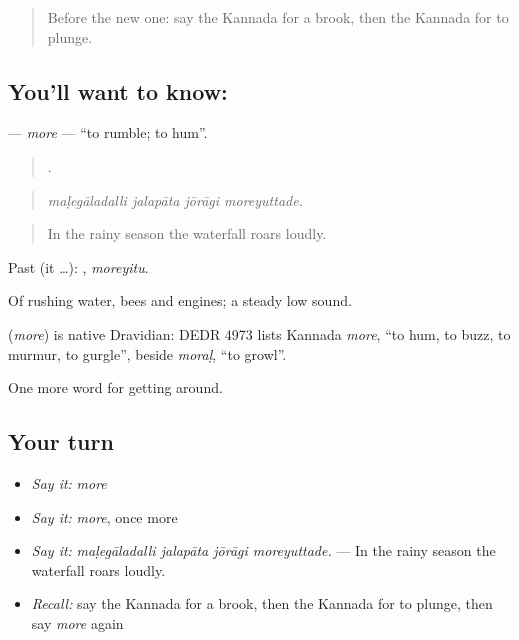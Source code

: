 \label{lesson:KA-C482-more}



\begin{quote}
Before the new one: say the Kannada for a brook, then the Kannada for to plunge.
\end{quote}

\subsection*{You'll want to know: }
\textbf{} — \emph{more} — \textquotedblleft{}to rumble; to hum\textquotedblright{}.

\begin{quote}
   .
\end{quote}

\begin{quote}
\emph{maḷegāladalli jalapāta jōrāgi moreyuttade.}
\end{quote}

\begin{quote}
In the rainy season the waterfall roars loudly.
\end{quote}

Past (it …): , \emph{moreyitu}.

Of rushing water, bees and engines; a steady low sound.

\begin{cousinweb}
\textbf{} (\emph{more}) is native Dravidian: DEDR 4973 lists Kannada \emph{more}, \textquotedblleft{}to hum, to buzz, to murmur, to gurgle\textquotedblright{}, beside \emph{moraḷ}, \textquotedblleft{}to growl\textquotedblright{}.
\end{cousinweb}

\begin{grammarlens}[title={What you've built}]
One more word for getting around.
\end{grammarlens}

\subsection*{Your turn}
\begin{itemize}
\raggedright
  \item \emph{Say it:} \emph{more}
  \item \emph{Say it:} \emph{more}, once more
  \item \emph{Say it:} \emph{maḷegāladalli jalapāta jōrāgi moreyuttade.} — In the rainy season the waterfall roars loudly.
  \item \emph{Recall:} say the Kannada for a brook, then the Kannada for to plunge, then say \emph{more} again
\end{itemize}


